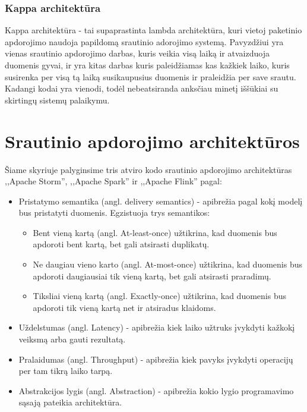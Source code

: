 \documentclass{VUMIFPSkursinis}
\begin{document}
\subsubsection{Kappa architektūra}

Kappa architektūra - tai supaprastinta lambda architektūra, kuri vietoj paketinio apdorojimo naudoja papildomą srautinio adorojimo systemą. Pavyzdžiui yra vienas srautinio apdorojimo darbas, kuris veikia visą laiką
ir atvaizduoja duomenis gyvai, ir yra kitas darbas kuris paleidžiamas kas kažkiek laiko, kuris susirenka per visą tą laiką susikaupusius duomenis ir praleidžia per save srautu. Kadangi kodai yra vienodi, todėl
nebeatsiranda anksčiau minetį iššūkiai su skirtingų sistemų palaikymu\cite{kreps2014questioning, kappa}.

\section{Srautinio apdorojimo architektūros} \label{srautarch}
Šiame skyriuje palyginsime tris atviro kodo srautinio apdorojimo architektūras ,,Apache Storm'', ,,Apache Spark'' ir ,,Apache Flink'' pagal:
\begin{itemize}
    \item Pristatymo semantika (angl. delivery semantics) - apibrežia pagal kokį modelį bus pristatyti duomenis. Egzistuoja trys semantikos\cite{ensar20}: 
    \begin{itemize}
        \item Bent vieną kartą (angl. At-least-once) užtikrina, kad duomenis bus apdoroti bent kartą, bet gali atsirasti duplikatų. 
        \item Ne daugiau vieno karto (angl. At-most-once) užtikrina, kad duomenis bus apdoroti daugiausiai tik vieną kartą, bet gali atsirasti praradimų. 
        \item Tiksliai vieną kartą (angl. Exactly-once) užtikrina, kad duomenis bus apdoroti tik vieną kartą net ir atsiradus klaidoms.
    \end{itemize}
    \item Uždelstumas (angl. Latency) - apibrežia kiek laiko užtruks įvykdyti kažkokį veiksmą arba gauti rezultatą.
    \item Pralaidumas (angl. Throughput) - apibrežia kiek pavyks įvykdyti operacijų per tam tikrą laiko tarpą.
    \item Abstrakcijos lygis (angl. Abstraction) - apibrežia kokio lygio programavimo sąsają pateikia architektūra.
\end{itemize}
\end{document}
